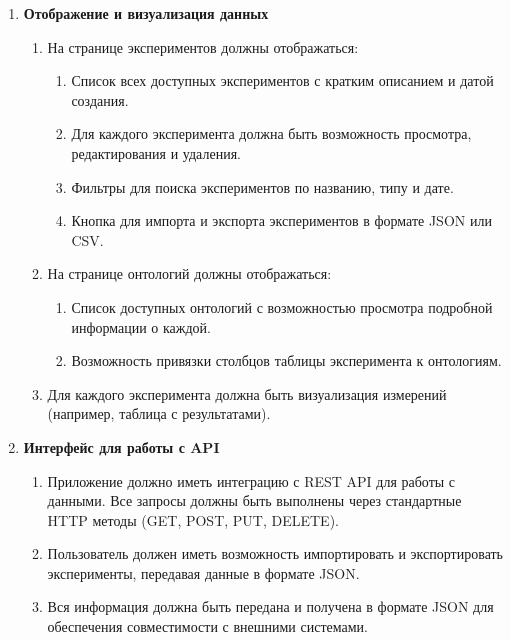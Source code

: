\documentclass[a4paper,12pt,reqno]{article}
\begin{document}
\begin{enumerate}
        \item \textbf{Отображение и визуализация данных}
        \begin{enumerate}[label=\arabic{enumi}.\arabic*.]
            \item На странице экспериментов должны отображаться:
            \begin{enumerate}[label=\arabic{enumi}.\arabic{enumii}.\arabic*.]
                \item Список всех доступных экспериментов с кратким описанием и датой создания.
                \item Для каждого эксперимента должна быть возможность просмотра, редактирования и удаления.
                \item Фильтры для поиска экспериментов по названию, типу и дате.
                \item Кнопка для импорта и экспорта экспериментов в формате JSON или CSV.
            \end{enumerate}
            \item На странице онтологий должны отображаться:
            \begin{enumerate}[label=\arabic{enumi}.\arabic{enumii}.\arabic*.]
                \item Список доступных онтологий с возможностью просмотра подробной информации о каждой.
                \item Возможность привязки столбцов таблицы эксперимента к онтологиям.
            \end{enumerate}
            \item Для каждого эксперимента должна быть визуализация измерений (например, таблица с результатами).
        \end{enumerate}

        \item \textbf{Интерфейс для работы с API}
        \begin{enumerate}[label=\arabic{enumi}.\arabic*.]
            \item Приложение должно иметь интеграцию с REST API для работы с данными. Все запросы должны быть выполнены через стандартные HTTP методы (GET, POST, PUT, DELETE).
            \item Пользователь должен иметь возможность импортировать и экспортировать эксперименты, передавая данные в формате JSON.
            \item Вся информация должна быть передана и получена в формате JSON для обеспечения совместимости с внешними системами.
        \end{enumerate}


\end{enumerate}
\end{document}

